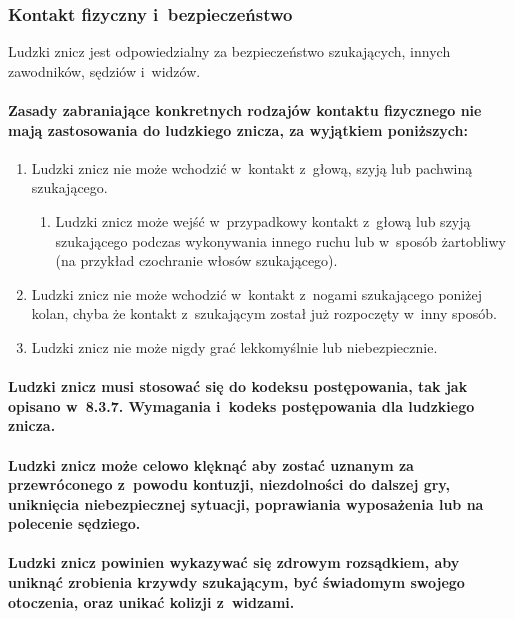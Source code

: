 \documentclass[12pt]{article}
\begin{document}
\subsubsection{Kontakt fizyczny i~bezpieczeństwo}

Ludzki znicz jest odpowiedzialny za bezpieczeństwo szukających, innych
zawodników, sędziów i~widzów.

\paragraph{Zasady zabraniające konkretnych rodzajów kontaktu
	fizycznego nie mają zastosowania do ludzkiego znicza, za wyjątkiem
	poniższych:}

\begin{enumerate}
	\item Ludzki znicz nie może wchodzić w~kontakt z~głową, szyją lub pachwiną
	      szukającego.
	      \begin{enumerate}
		      \item Ludzki znicz może wejść w~przypadkowy kontakt z~głową lub szyją
		            szukającego podczas wykonywania innego ruchu lub w~sposób żartobliwy (na
		            przykład czochranie włosów szukającego).
	      \end{enumerate}

	\item Ludzki znicz nie może wchodzić w~kontakt z~nogami szukającego poniżej
	      kolan, chyba że kontakt z~szukającym został już rozpoczęty w~inny
	      sposób.

	\item Ludzki znicz nie może nigdy grać lekkomyślnie lub niebezpiecznie.
\end{enumerate}

\paragraph{Ludzki znicz musi stosować się do kodeksu
	postępowania, tak jak opisano w~8.3.7. Wymagania i~kodeks postępowania
	dla ludzkiego znicza.}

\paragraph{Ludzki znicz może celowo klęknąć aby zostać uznanym za
	przewróconego z~powodu kontuzji, niezdolności do dalszej gry, uniknięcia
	niebezpiecznej sytuacji, poprawiania wyposażenia lub na polecenie
	sędziego.}

\paragraph{Ludzki znicz powinien wykazywać się zdrowym
	rozsądkiem, aby uniknąć zrobienia krzywdy szukającym, być świadomym
	swojego otoczenia, oraz unikać kolizji z~widzami.}
\end{document}
